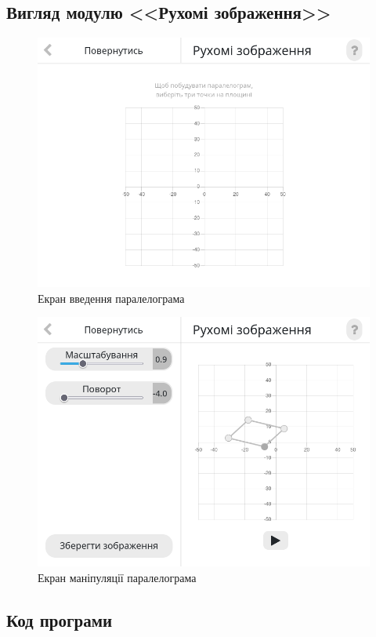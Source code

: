\documentclass[oneside,14pt]{extarticle}
\begin{document}
\begin{normalsize}
	\subsection{Вигляд модулю <<Рухомі зображення>>}
	\begin{figure}[H]
		\centering
		\includegraphics[scale=0.6]{41}
		\caption{Екран введення паралелограма}
	\end{figure}
	
	\begin{figure}[H]
		\centering
		\includegraphics[scale=0.6]{42}
		\caption{Екран маніпуляції паралелограма}
	\end{figure}
	
	\subsection{Код програми}

\end{normalsize}
\end{document}
